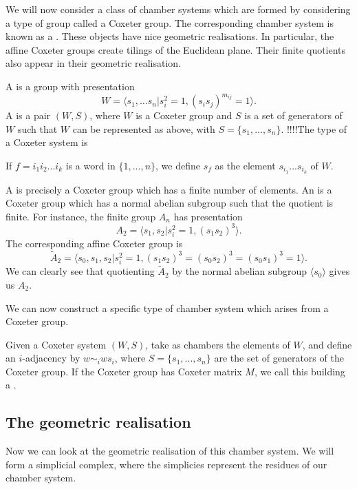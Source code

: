 \documentclass[11pt]{article}
\begin{document}
We will now consider a class of chamber systems which are formed by considering a type of group called a Coxeter group. The corresponding chamber system is known as a . These objects have nice geometric realisations. In particular, the affine Coxeter groups create tilings of the Euclidean plane. Their finite quotients also appear in their geometric realisation. 

\begin{definition}
    A  is a group with presentation
    \[W=\langle s_1,\hdots s_n | s_i^2=1, (s_is_j)^{m_{ij}}=1\rangle.\]
    A  is a pair $(W,S)$, where $W$ is a Coxeter group and $S$ is a set of generators of $W$ such that $W$ can be represented as above, with $S=\{s_1,\hdots,s_n\}$. !!!!The type of a Coxeter system is
\end{definition}

\begin{definition}
    If $f=i_1i_2...i_k$ is a word in $\{1,...,n\}$, we define $s_f$ as the element $s_{i_1}...s_{i_k}$ of $W$.
\end{definition}

A  is precisely a Coxeter group which has a finite number of elements. An  is a Coxeter group which has a normal abelian subgroup such that the quotient is finite. For instance, the finite group $A_n$ has presentation
\[A_2=\langle s_1,s_2|s_i^2=1, (s_1s_2)^3\rangle.\]
The corresponding affine Coxeter group is
\[\tilde{A}_2=\langle s_0,s_1,s_2|s_i^2=1, (s_1s_2)^3=(s_0s_2)^3=(s_0s_1)^3=1\rangle.\]
We can clearly see that quotienting $\tilde{A}_2$ by the normal abelian subgroup $\langle s_0\rangle$ gives us $A_2$. 


We can now construct a specific type of chamber system which arises from a Coxeter group. 

Given a Coxeter system $(W,S)$, take as chambers the elements of $W$, and define an $i$-adjacency by $w\sim_iws_i$, where $S=\{s_1,...,s_n\}$ are the set of generators of the Coxeter group. If the Coxeter group has Coxeter matrix $M$, we call this building a .\\


\subsection{The geometric realisation}
Now we can look at the geometric realisation of this chamber system. We will form a simplicial complex, where the simplicies represent the residues of our chamber system. 
\end{document}
